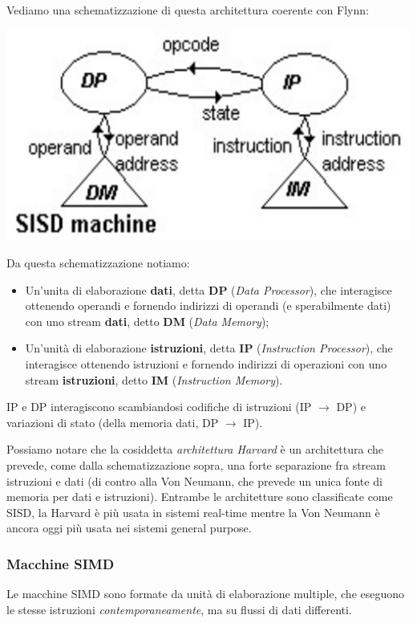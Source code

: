 \documentclass[a4paper,11pt]{article}
\begin{document}
Vediamo una schematizzazione di questa architettura coerente con Flynn:
\begin{center}
	\includegraphics[scale=0.2]{../figures/sisd_flynn.png}
\end{center}

Da questa schematizzazione notiamo:
\begin{itemize}
	\item Un'unita di elaborazione \textbf{dati}, detta \textbf{DP} (\textit{Data Processor}), che interagisce ottenendo operandi e fornendo indirizzi di operandi (e sperabilmente dati) con uno stream \textbf{dati}, detto \textbf{DM} (\textit{Data Memory});
	\item Un'unità di elaborazione \textbf{istruzioni}, detta \textbf{IP} (\textit{Instruction Processor}), che interagisce ottenendo istruzioni e fornendo indirizzi di operazioni con uno stream \textbf{istruzioni}, detto \textbf{IM} (\textit{Instruction Memory}).
\end{itemize}

IP e DP interagiscono scambiandosi codifiche di istruzioni (IP $\rightarrow$ DP) e variazioni di stato (della memoria dati, DP $\rightarrow$ IP). 

Possiamo notare che la cosiddetta \textit{architettura Harvard} è un architettura che prevede, come dalla schematizzazione sopra, una forte separazione fra stream istruzioni e dati (di contro alla Von Neumann, che prevede un unica fonte di memoria per dati e istruzioni). 
Entrambe le architetture sono classificate come SISD, la Harvard è più usata in sistemi real-time mentre la Von Neumann è ancora oggi più usata nei sistemi general purpose.

\subsubsection{Macchine SIMD}
Le macchine SIMD sono formate da unità di elaborazione multiple, che eseguono le stesse istruzioni \textit{contemporaneamente}, ma su flussi di dati differenti.
\end{document}

